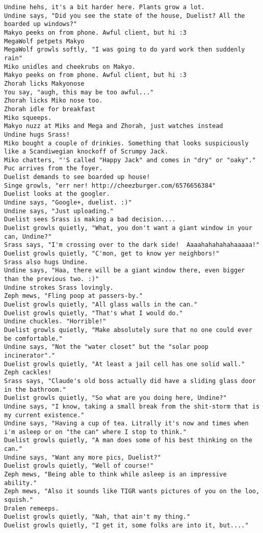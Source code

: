 \begin{verbatim}
Undine hehs, it's a bit harder here. Plants grow a lot.
Undine says, "Did you see the state of the house, Duelist? All the boarded up windows?"
Makyo peeks on from phone. Awful client, but hi :3
MegaWolf petpets Makyo
MegaWolf growls softly, "I was going to do yard work then suddenly rain"
Miko unidles and cheekrubs on Makyo.
Makyo peeks on from phone. Awful client, but hi :3
Zhorah licks Makyonose
You say, "augh, this may be too awful..."
Zhorah licks Miko nose too.
Zhorah idle for breakfast
Miko squeeps.
Makyo nuzz at Miks and Mega and Zhorah, just watches instead
Undine hugs Srass!
Miko bought a couple of drinkies. Something that looks suspiciously like a Scandiwegian knockoff of Scrumpy Jack.
Miko chatters, "'S called "Happy Jack" and comes in "dry" or "oaky"."
Puc arrives from the foyer.
Duelist demands to see boarded up house!
Singe growls, "err ner! http://cheezburger.com/6576656384"
Duelist looks at the googler.
Undine says, "Google+, duelist. :)"
Undine says, "Just uploading."
Duelist sees Srass is making a bad decision....
Duelist growls quietly, "What, you don't want a giant window in your can, Undine?"
Srass says, "I'm crossing over to the dark side!  Aaaahahahahahaaaaa!"
Duelist growls quietly, "C'mon, get to know yer neighbors!"
Srass also hugs Undine.
Undine says, "Haa, there will be a giant window there, even bigger than the previous two. :)"
Undine strokes Srass lovingly.
Zeph mews, "Fling poop at passers-by."
Duelist growls quietly, "All glass walls in the can."
Duelist growls quietly, "That's what I would do."
Undine chuckles. "Horrible!"
Duelist growls quietly, "Make absolutely sure that no one could ever be comfortable."
Undine says, "Not the "water closet" but the "solar poop incinerator"."
Duelist growls quietly, "At least a jail cell has one solid wall."
Zeph cackles!
Srass says, "Claude's old boss actually did have a sliding glass door in the bathroom."
Duelist growls quietly, "So what are you doing here, Undine?"
Undine says, "I know, taking a small break from the shit-storm that is my current existence."
Undine says, "Having a cup of tea. Litrally it's now and times when i'm asleep or on "the can" where I stop to think."
Duelist growls quietly, "A man does some of his best thinking on the can."
Undine says, "Want any more pics, Duelist?"
Duelist growls quietly, "Well of course!"
Zeph mews, "Being able to think while asleep is an impressive ability."
Zeph mews, "Also it sounds like TIGR wants pictures of you on the loo, squish."
Dralen remeeps.
Duelist growls quietly, "Nah, that ain't my thing."
Duelist growls quietly, "I get it, some folks are into it, but...."

\end{verbatim}
